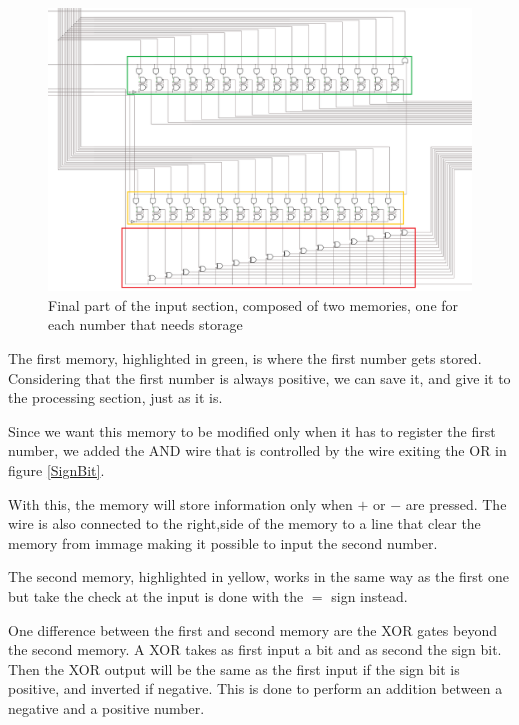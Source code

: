 \documentclass{article}
\begin{document}
\begin{figure}[h]
    \centering  
    \includegraphics[scale=.4]{IM_Memories.PNG}
    \caption{Final part of the input section, composed of two memories, one for each number that needs storage}
    \label{Memories}
\end{figure}

\vspace{3mm}

The first memory, highlighted in green, is where the first number gets stored. Considering that the first number is always positive, we can save it, and give it to the processing section, just as it is. 

\vspace{1mm}

Since we want this memory to be modified only when it has to register the first number, we added the AND wire that is controlled by the wire exiting the OR in figure \ref{SignBit}. 

\vspace{1mm}

With this, the memory will store information only when $+$ or $-$ are pressed. The wire is also connected to the right,side of the memory to a line that clear the memory from immage%
making it possible to input the second number.

\vspace{3mm}

The second memory, highlighted in yellow, works in the same way as the first one but take the check at the input is done with the $=$ sign instead. %

One difference between the first and second memory are the XOR gates beyond the second memory. A XOR takes as first input a bit and as second the sign bit. Then the XOR output will be the same as the first input if the sign bit is positive, and inverted if negative. This is done to perform an addition between a negative and a positive number. 
\end{document}
